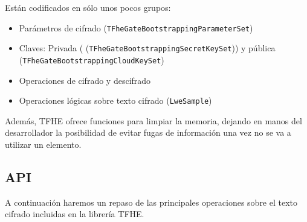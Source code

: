 Están codificados en sólo unos pocos grupos:

\begin{itemize}
  \item Parámetros de cifrado (\texttt{TFheGateBootstrappingParameterSet})
  \item Claves: Privada ( (\texttt{TFheGateBootstrappingSecretKeySet})) y pública (\texttt{TFheGateBootstrappingCloudKeySet})
  \item Operaciones de cifrado y descifrado
  \item Operaciones lógicas sobre texto cifrado (\texttt{LweSample})
\end{itemize}

Además, TFHE ofrece funciones para limpiar la memoria, dejando en manos del desarrollador la posibilidad de evitar fugas de información una vez no se va a utilizar un elemento.

\subsection{API}

A continuación haremos un repaso de las principales operaciones sobre el texto cifrado incluidas en la librería TFHE.

